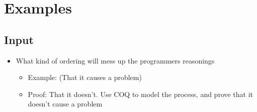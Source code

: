 \section{Examples}
\subsection{Input}
\begin{frame}
\begin{itemize}
  \item What kind of ordering will mess up the programmers reasonings
     \begin{itemize}
     \item Example: (That it causes a problem)
     \item Proof: That it doesn't. Use COQ to model the process, and prove that it doesn't cause a problem
     \end{itemize}
\end{itemize}
\end{frame}

